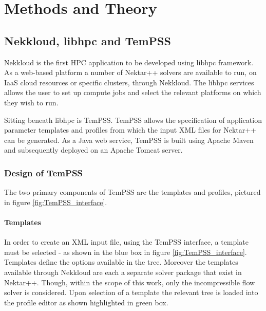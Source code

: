 \documentclass[11pt, a4paper]{report}
\begin{document}
\newpage
\chapter{Methods and Theory}

\section{Nekkloud, libhpc and TemPSS}
Nekkloud is the first HPC application to be developed using libhpc framework. As a web-based platform a number of Nektar++ solvers are available to run, on IaaS cloud resources or specific clusters, through Nekkloud. The libhpc services allows the user to set up compute jobs and select the relevant platforms on which they wish to run.

Sitting beneath libhpc is TemPSS. TemPSS allows the specification of application parameter templates and profiles from which the input XML files for Nektar++ can be generated. As a Java web service, TemPSS is built using Apache Maven and subsequently deployed on an Apache Tomcat server.

\subsection{Design of TemPSS}
The two primary components of TemPSS are the templates and profiles, pictured in figure \ref{fig:TemPSS_interface}.

\subsubsection{Templates}
In order to create an XML input file, using the TemPSS interface, a template must be selected - as shown in the \textcolor{myblue}{blue box} in figure \ref{fig:TemPSS_interface}. Templates define the options available in the tree. Moreover the templates available through Nekkloud are each a separate solver package that exist in Nektar++. Though, within the scope of this work, only the incompressible flow solver is considered. Upon selection of a template the relevant tree is loaded into the profile editor as shown highlighted in \textcolor{mygreen}{green box}. 
\end{document}

